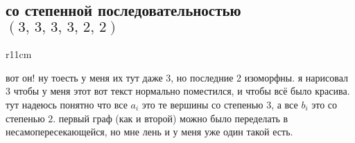 \documentclass{article}
\begin{document}
  \subsection{со степенной последовательностью $(3,\, 3,\, 3,\, 3,\, 2,\, 2)$}
  \begin{wrapfigure}{r}{11cm}
    \vspace{-.5cm}
    \hfill
    \vspace{-.5cm}
  \end{wrapfigure}
  вот он!
  ну тоесть у меня их тут даже 3, но последние 2 изоморфны.
  я нарисовал 3 чтобы у меня этот вот текст нормально поместился, и чтобы всё было красива.
  тут надеюсь понятно что все $a_i$ это те вершины со степенью $3$, а все $b_i$ это со степенью $2$.
  первый граф (как и второй) можно было переделать в несамопересекающейся, но мне лень и у меня уже один такой есть.
\end{document}
